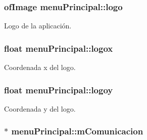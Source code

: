 \hypertarget{classmenu_principal_aa5ec7fdf5031285aab08c58e0fecbd82}{}
\subsubsection[{logo}]{\setlength{\rightskip}{0pt plus 5cm}of\+Image menu\+Principal\+::logo\hspace{0.3cm}{\ttfamily [private]}}\label{classmenu_principal_aa5ec7fdf5031285aab08c58e0fecbd82}


Logo de la aplicación. 

\hypertarget{classmenu_principal_aca0ebae92aafb9026c9aace3e23463fb}{}
\subsubsection[{logox}]{\setlength{\rightskip}{0pt plus 5cm}float menu\+Principal\+::logox\hspace{0.3cm}{\ttfamily [private]}}\label{classmenu_principal_aca0ebae92aafb9026c9aace3e23463fb}


Coordenada x del logo. 

\hypertarget{classmenu_principal_a1f1f6764a1253e7fa12f9cee448f29b9}{}
\subsubsection[{logoy}]{\setlength{\rightskip}{0pt plus 5cm}float menu\+Principal\+::logoy\hspace{0.3cm}{\ttfamily [private]}}\label{classmenu_principal_a1f1f6764a1253e7fa12f9cee448f29b9}


Coordenada y del logo. 

\hypertarget{classmenu_principal_af820d04d0e35fa1f4c552af95d5e3036}{}
\subsubsection[{m\+Comunicacion}]{$\ast$ menu\+Principal\+::m\+Comunicacion\hspace{0.3cm}{\ttfamily [private]}}\label{classmenu_principal_af820d04d0e35fa1f4c552af95d5e3036}


